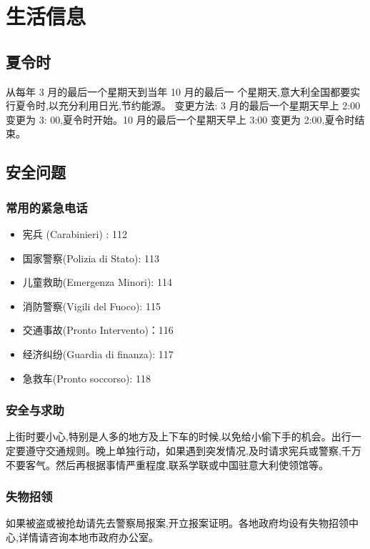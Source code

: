 \chapter{生活信息}              

\section{夏令时} 

从每年 3 月的最后一个星期天到当年 10 月的最后一 个星期天,意大利全国都要实行夏令时,以充分利用日光,节约能源。 变更方法: 3 月的最后一个星期天早上 2:00 变更为 3: 00,夏令时开始。10 月的最后一个星期天早上 3:00 变更为 2:00,夏令时结束。 

\section{安全问题}

\subsection{常用的紧急电话}

\begin{itemize}
\item 宪兵 (Carabinieri) : 112 
\item 国家警察(Polizia di Stato): 113 
\item 儿童救助(Emergenza Minori): 114
\item 消防警察(Vigili del Fuoco): 115 
\item 交通事故(Pronto Intervento)：116 
\item 经济纠纷(Guardia di finanza): 117
\item 急救车(Pronto soccorso): 118
\end{itemize}

\subsection{安全与求助}
上街时要小心,特别是人多的地方及上下车的时候,以免给小偷下手的机会。出行一定要遵守交通规则。晚上单独行动，如果遇到突发情况,及时请求宪兵或警察,千万不要客气。然后再根据事情严重程度,联系学联或中国驻意大利使领馆等。

\subsection{失物招领}
如果被盗或被抢劫请先去警察局报案,开立报案证明。各地政府均设有失物招领中心,详情请咨询本地市政府办公室。

